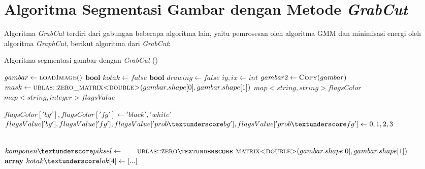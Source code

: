 \section{Algoritma Segmentasi Gambar dengan Metode \emph{GrabCut}}

Algoritma \emph{GrabCut} terdiri dari gabungan beberapa algoritma lain, yaitu 
pemrosesan oleh algoritma GMM dan minimisasi energi oleh algoritma \emph{GraphCut},
berikut algoritma dari \emph{GrabCut}:  

\begin{algorithm}                     
\caption{Algoritma segmentasi gambar dengan \emph{GrabCut} (\cite{Rother:2004})}          
\label{algo:grabcut}                          
\begin{algorithmic}                    %
    \State $gambar \gets \Call{loadImage}$  
    \State $\textbf{bool } kotak \gets false$ 
    \State $\textbf{bool } drawing \gets false$ 
    \State $iy, ix \gets int$
    \State $gambar2 \gets \Call{Copy}{gambar}$
    \State $mask \gets \Call{ublas::zero\textunderscore matrix<double>}{gambar.shape[0], gambar.shape[1]}$
    \State $map<string, string> flagsColor$
    \State $map<string, integer> flagsValue$
    
    \State $flagsColor['bg'], flagsColor['fg']  \gets 'black', 'white'$
    \State $flagsValue['bg'], flagsValue['fg'], flagsValue['prob\textunderscore bg'], flagsValue['prob\textunderscore fg'] \newline
     \gets 0, 1, 2, 3$
    
    \\
    \State $komponen\textunderscore piksel \gets \newline
    \hspace*{2em} \Call{ublas::zero\textunderscore matrix<double>}{gambar.shape[0], gambar.shape[1]}$
    \State $\textbf{array } kotak\textunderscore lok[4] \gets [...]$


\end{algorithmic}
\end{algorithm}
